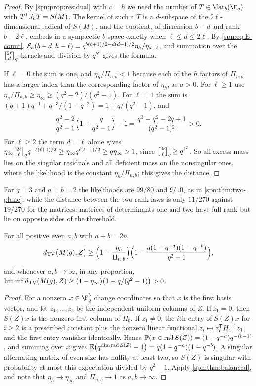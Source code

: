 \begin{proof}
By \cref{spn:prop:residual} with $c=h$ we need the number of $T\in\spnMat_b(\F_q)$ with
$T^{\mathsf{T}}J_hT=S(M)$. The kernel of such a $T$ is a $d$-subspace of the $2\ell$-dimensional
radical of $S(M)$, and the quotient, of dimension $b-d$ and rank $b-2\ell$, embeds in a
symplectic $b$-space exactly when $\ell\le d\le2\ell$. By \eqref{spn:eq:E-count},
$\mathcal{E}_h(b-d,h-\ell)=q^{b(b+1)/2-d(d+1)/2}\eta_h/\eta_{d-\ell}$, and summation over the
$\spnqbin{2\ell}dq$ kernels and division by $q^{b^2}$ gives the formula.

If $\ell=0$ the sum is one, and $\eta_h/\Pi_{n,b}<1$ because each of the $h$ factors of
$\Pi_{n,b}$ has a larger index than the corresponding factor of $\eta_h$, as $a>0$. For $\ell\ge1$
use $\eta_h/\Pi_{n,b}\ge\eta_\infty\ge(q^2-2)/(q^2-1)$. For $\ell=1$ the sum is
$(q+1)q^{-1}+q^{-3}/(1-q^{-2})=1+q/(q^2-1)$, and
\[
 \frac{q^2-2}{q^2-1}\Bigl(1+\frac{q}{q^2-1}\Bigr)-1=\frac{q^3-q^2-2q+1}{(q^2-1)^2}>0 .
\]
For $\ell\ge2$ the term $d=\ell$ alone gives
$\eta_\infty\spnqbin{2\ell}{\ell}{q}q^{-\ell(\ell+1)/2}\ge\eta_\infty q^{\ell(\ell-1)/2}\ge
q\eta_\infty>1$, since $\spnqbin{2\ell}\ell q\ge q^{\ell^2}$. So all excess mass lies on the
singular residuals and all deficient mass on the nonsingular ones, where the likelihood is the
constant $\eta_h/\Pi_{n,b}$; this gives the distance.
\end{proof}

For $q=3$ and $a=b=2$ the likelihoods are $99/80$ and $9/10$, as in \cref{spn:thm:two-plane},
while the distance between the two rank laws is only $11/270$ against $19/270$ for the matrices:
matrices of determinants one and two have full rank but lie on opposite sides of the threshold.

\begin{corollary}\label{spn:cor:balanced-lower}
For all positive even $a,b$ with $a+b=2n$,
\[
 d_{\mathrm{TV}}\bigl(M(g),Z\bigr)\ge\Bigl(1-\frac{\eta_h}{\Pi_{n,b}}\Bigr)
 \Bigl(1-\frac{q(1-q^{-a})(1-q^{-b})}{q^2-1}\Bigr),
\]
and whenever $a,b\to\infty$, in any proportion,
$\liminf d_{\mathrm{TV}}(M(g),Z)\ge(1-\eta_\infty)\bigl(1-q/(q^2-1)\bigr)>0$.
\end{corollary}

\begin{proof}
For a nonzero $x\in\F_q^b$ change coordinates so that $x$ is the first basis vector, and let
$z_1,\dots,z_b$ be the independent uniform columns of $Z$. If $z_1=0$, then $S(Z)x$ is the
nonzero first column of $H_0$. If $z_1\ne0$, the $i$th entry of $S(Z)x$ for $i\ge2$ is a
prescribed constant plus the nonzero linear functional $z_i\mapsto z_i^{\mathsf{T}}H_1^{-1}z_1$, and
the first entry vanishes identically. Hence $\mathbb{P}(x\in\operatorname{rad}S(Z))=(1-q^{-a})q^{-(b-1)}$,
and summing over $x$ gives
$\mathbb{E}\bigl(q^{\dim\operatorname{rad}S(Z)}-1\bigr)=q(1-q^{-a})(1-q^{-b})$. A singular
alternating matrix of even size has nullity at least two, so $S(Z)$ is singular with probability
at most this expectation divided by $q^2-1$. Apply \cref{spn:thm:balanced}, and note that
$\eta_h\to\eta_\infty$ and $\Pi_{n,b}\to1$ as $a,b\to\infty$.
\end{proof}

